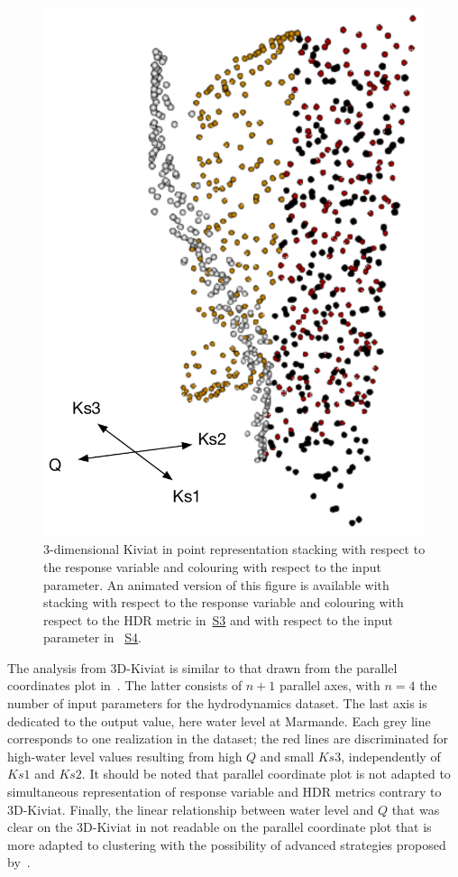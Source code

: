 \begin{figure}[!h]
\centering
\includegraphics[width=0.6\linewidth,keepaspectratio]{fig/contributions/visu/mascaret_mesh_points.pdf}
\caption{3-dimensional Kiviat in point representation stacking with respect to the response variable and colouring with respect to the input parameter. An animated version of this figure is available with stacking with respect to the response variable and colouring with respect to the HDR metric in~\hyperref[S3]{S3} and with respect to the input parameter in ~\hyperref[S4]{S4}.}
\label{fig:mesh}
\end{figure}

The analysis from 3D-Kiviat is similar to that drawn from the parallel coordinates plot in~. The latter consists of $n+1$ parallel axes, with $n=4$ the number of input parameters for the hydrodynamics dataset. The last axis is dedicated to the output value, here water level at Marmande. Each grey line corresponds to one realization in the dataset; the red lines are discriminated for high-water level values resulting from high $Q$ and small $Ks3$, independently of $Ks1$ and $Ks2$. It should be noted that parallel coordinate plot is not adapted to simultaneous representation of response variable and HDR metrics contrary to 3D-Kiviat. Finally, the linear relationship between water level and $Q$ that was clear on the 3D-Kiviat in not readable on the parallel coordinate plot that is more adapted to clustering with the possibility of advanced strategies proposed by~\citep{Claessen2011,Raidou2016}.

